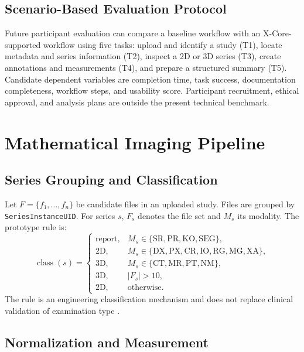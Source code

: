 \documentclass[journal]{IEEEtran}
\begin{document}
\subsection{Scenario-Based Evaluation Protocol}

Future participant evaluation can compare a baseline workflow with an X-Core-supported workflow using five tasks: upload and identify a study (T1), locate metadata and series information (T2), inspect a 2D or 3D series (T3), create annotations and measurements (T4), and prepare a structured summary (T5). Candidate dependent variables are completion time, task success, documentation completeness, workflow steps, and usability score. Participant recruitment, ethical approval, and analysis plans are outside the present technical benchmark.

\section{Mathematical Imaging Pipeline}
\label{sec:math}

\subsection{Series Grouping and Classification}

Let $F=\{f_1,\ldots,f_n\}$ be candidate files in an uploaded study. Files are grouped by \texttt{SeriesInstanceUID}. For series $s$, $F_s$ denotes the file set and $M_s$ its modality. The prototype rule is:
\begin{equation}
\operatorname{class}(s)=
\begin{cases}
\mathrm{report}, & M_s\in\{\mathrm{SR},\mathrm{PR},\mathrm{KO},\mathrm{SEG}\},\\
2\mathrm{D}, & M_s\in\{\mathrm{DX},\mathrm{PX},\mathrm{CR},\mathrm{IO},\mathrm{RG},\mathrm{MG},\mathrm{XA}\},\\
3\mathrm{D}, & M_s\in\{\mathrm{CT},\mathrm{MR},\mathrm{PT},\mathrm{NM}\},\\
3\mathrm{D}, & |F_s|>10,\\
2\mathrm{D}, & \text{otherwise}.
\end{cases}
\end{equation}
The rule is an engineering classification mechanism and does not replace clinical validation of examination type \cite{ref:dicom}.

\subsection{Normalization and Measurement}
\end{document}
